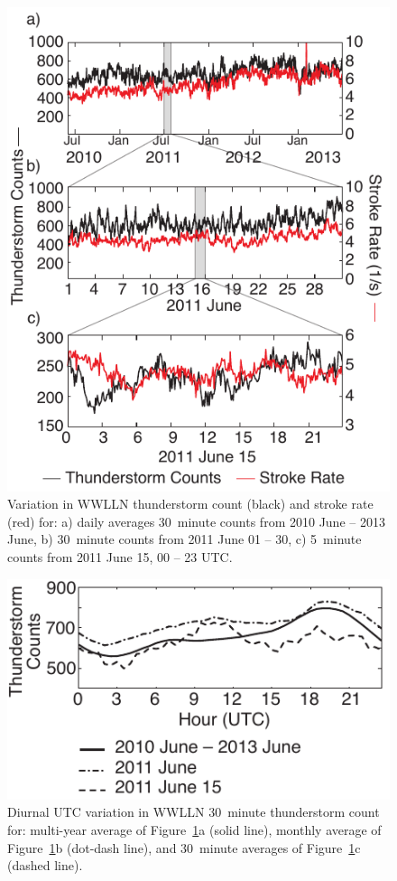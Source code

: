  \begin{figure}[ht!]
    \centering
    \includegraphics[scale=1]{GEC/Figures/timescale.pdf} 
    \caption{Variation in WWLLN thunderstorm count (black) and stroke rate (red) for:
    		a) daily averages 30~minute counts from 2010 June -- 2013 June,
		b) 30~minute counts from 2011 June 01 -- 30,
		c) 5~minute counts from 2011 June 15, 00 -- 23 UTC.}
    \label{timescale}
 \end{figure}
 
 \begin{figure}[ht!]
    \centering
    \includegraphics[scale=1]{GEC/Figures/averaging.pdf} 
    \caption{Diurnal UTC variation in WWLLN 30~minute thunderstorm count for:
    		multi-year average of Figure~\ref{timescale}a (solid line),
		monthly average of Figure~\ref{timescale}b (dot-dash line),
		and 30~minute averages of Figure~\ref{timescale}c (dashed line).}
    \label{averaging}
 \end{figure}
 
